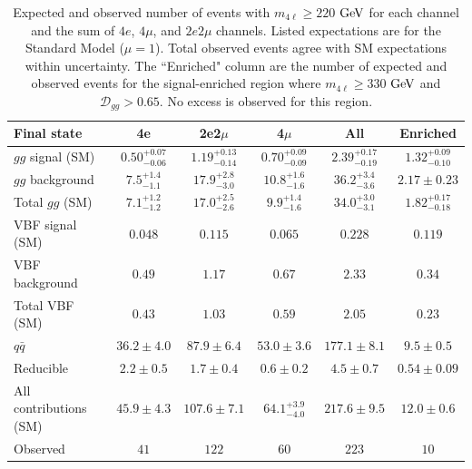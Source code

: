 \renewcommand{\arraystretch}{0.8}
\begin{table}[htbp]
\begin{center}
\begin{tabular}{l|c|c|c|c|c}
\hline
Final state & 4e  &  2e2$\mu$  & 4$\mu$  & All & Enriched \\
\hline
$gg$ signal (SM) &  $0.50^{+0.07}_{-0.06}$ & $1.19^{+0.13}_{-0.14}$ &  $0.70^{+0.09}_{-0.09}$ &  $2.39^{+0.17}_{-0.19}$ & $1.32^{+0.09}_{-0.10}$ \\
$gg$ background &  $7.5^{+1.4}_{-1.1}$  & $17.9^{+2.8}_{-3.0}$  & $10.8^{+1.6}_{-1.6}$ &  $36.2^{+3.4}_{-3.6}$ & $2.17\pm 0.23$ \\
Total $gg$ (SM) & $7.1^{+1.2}_{-1.2}$ & $17.0^{+2.5}_{-2.6}$ & $9.9^{+1.4}_{-1.6}$ & $34.0^{+3.0}_{-3.1}$ & $1.82^{+0.17}_{-0.18}$ \\
\hline
VBF signal (SM) & $0.048$ & $0.115$ & $0.065$ & $0.228$ & $0.119$ \\                                                                       
VBF background & $0.49$ & $1.17$ & $0.67$ & $2.33$ & $0.34$ \\                                                                             
Total VBF (SM) & $0.43$ & $1.03$ & $0.59$ & $2.05$ & $0.23$ \\
\hline
$q\bar{q}$ & $36.2\pm 4.0$  & $87.9\pm 6.4$  & $53.0\pm 3.6$  & $177.1\pm 8.1$ & $9.5\pm 0.5$  \\
Reducible & $2.2\pm 0.5$ & $1.7\pm 0.4$ & $0.6\pm 0.2$ & $4.5\pm 0.7$ & $0.54\pm 0.09$ \\
\hline
All contributions (SM) & $45.9\pm 4.3$  & $107.6\pm 7.1$ & $64.1^{+3.9}_{-4.0}$  & $217.6\pm 9.5$ & $12.0\pm 0.6$ \\
\hline
Observed  & $41$ & $122$ & $60$ & $223$ & $10$ \\
\hline
\end{tabular}
\caption[Expected and Observed $4\ell$ Yields in Off-Shell Region]{Expected and observed number of events with $m_{4\ell}\geq 220$ $\rm{GeV}$ for each channel and the sum of $4e$, $4\mu$, and $2e2\mu$ channels. Listed expectations are for the Standard Model ($\mu=1$). Total observed events agree with SM expectations within uncertainty. The ``Enriched" column are the number of expected and observed events for the signal-enriched region where $m_{4\ell}\geq 330$ $\rm{GeV}$ and $\mathcal{D}_{gg}>0.65$. No excess is observed for this region.}
\label{tbl:OffShell4lYields}
\end{center}
\end{table}

